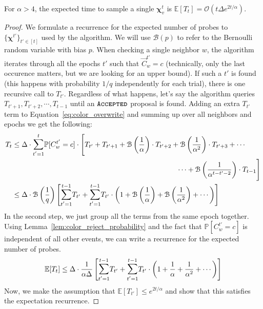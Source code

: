 \begin{lemma}
\label{lem:coloring_recurrence}
For $\alpha>4$, the expected time to sample a single $\bm\chi^t_v$ is $\mathbb E[T_t] = \mathcal{O}\left(t\Delta e^{2t/\alpha}\right)$.
\end{lemma}
\begin{proof}
We formulate a recurrence for the expected number of probes to $\{\bm\chi^{t'}\}_{t'\in[t]}$ used by the algorithm.
We will use $\mathcal B(p)$ to refer to the Bernoulli random variable with bias $p$.
When checking a single neighbor $w$, the algorithm iterates through all the epochs $t'$ such that $\vec C^{t'}_w = c$
(technically, only the last occurence matters, but we are looking for an upper bound).
If such a $t'$ is found (this happens with probability $1/q$ independently for each trial), there is one recursive call to $T_{t'}$.
Regardless of what happens, let's say the algorithm queries $T_{t'+1}, T_{t'+2}, \cdots, T_{t-1}$ until an $\texttt{\textsc{Accepted}}$ proposal is found.
Adding an extra $T_{t'}$ term to Equation~\ref{eq:color_overwrite} and summing up over all neighbors and epochs we get the following:
\begin{align}
T_{t} &\le \Delta \cdot \mathlarger\sum\limits_{t'=1}^{t} \mathbb P[C^{t'}_w = c]\cdot
\Biggl[ T_{t'} + T_{t'+1} + \mathcal B\left(\frac{1}{\alpha}\right)\cdot T_{t'+2}
+ \mathcal B\left(\frac{1}{\alpha^2}\right)\cdot T_{t'+3} + \cdots\\
&\hspace{23em}
\cdots + \mathcal B\left(\frac{1}{\alpha^{t-t'-2}}\right)\cdot T_{t-1} \Biggr]\\
&\le \Delta\cdot\mathcal B\left( \frac{1}{q}\right) \Biggl[
\mathlarger\sum\limits_{t'=1}^{t-1} T_{t'} +
\mathlarger\sum\limits_{t'=1}^{t-1} T_{t'}\cdot \left(1 + \mathcal B\left(\frac1\alpha\right) + \mathcal B\left(\frac1{\alpha^2}\right) + \cdots\right)
\Biggr]
\end{align}
In the second step, we just group all the terms from the same epoch together.
Using Lemma~\ref{lem:color_reject_probability} and the fact that $\mathbb P[C^{t'}_w = c]$ is independent of all other events,
we can write a recurrence for the expected number of probes.
\begin{align}
\mathbb E[T_t]\le \Delta\cdot\frac{1}{\alpha\Delta}
\left[
\mathlarger\sum\limits_{t'=1}^{t-1} T_{t'} + \mathlarger\sum\limits_{t'=1}^{t-1} T_{t'}\cdot
\left(1 + \frac1\alpha + \frac1{\alpha^2} + \cdots\right)
\right]
\end{align}
Now, we make the assumption that $\mathbb E[T_{t'}]\le e^{2t/\alpha}$ and show that this satisfies the expectation recurrence.

\end{proof}
